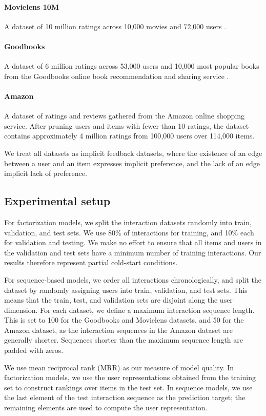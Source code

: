 \documentclass[sigchi]{acmart}
\begin{document}
\paragraph{Movielens 10M} A dataset of 10 million ratings across 10,000 movies and 72,000 users \citep{harper2016movielens}.
\paragraph{Goodbooks} A dataset of 6 million ratings across 53,000 users and 10,000 most popular books from the Goodbooks online book recommendation and sharing service \citep{goodbooks2017}.
\paragraph{Amazon} A dataset of ratings and reviews gathered from the Amazon online shopping service. After pruning users and items with fewer than 10 ratings, the dataset contains approximately 4 million ratings from 100,000 users over 114,000 items.

We treat all datasets as implicit feedback datasets, where the existence of an edge between a user and an item expresses implicit preference, and the lack of an edge implicit lack of preference.

\subsection{Experimental setup}
For factorization models, we split the interaction datasets randomly into train, validation, and test sets. We use 80\% of interactions for training, and 10\% each for validation and testing. We make no effort to ensure that all items and users in the validation and test sets have a minimum number of training interactions. Our results therefore represent partial cold-start conditions.

For sequence-based models, we order all interactions chronologically, and split the dataset by randomly assigning users into train, validation, and test sets. This means that the train, test, and validation sets are disjoint along the user dimension. For each dataset, we define a maximum interaction sequence length. This is set to 100 for the Goodbooks and Movielens datasets, and 50 for the Amazon dataset, as the interaction sequences in the Amazon dataset are generally shorter. Sequences shorter than the maximum sequence length are padded with zeros.

We use mean reciprocal rank (MRR) as our measure of model quality. In factorization models, we use the user representations obtained from the training set to construct rankings over items in the test set. In sequence models, we use the last element of the test interaction sequence as the prediction target; the remaining elements are used to compute the user representation.
\end{document}
